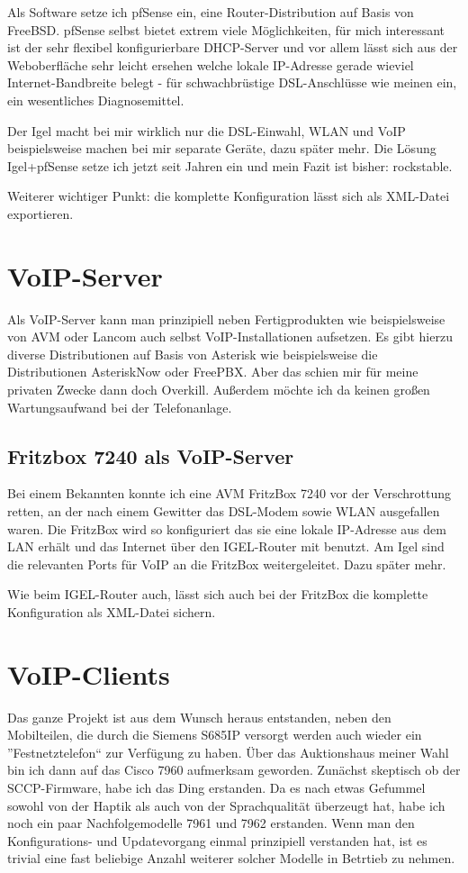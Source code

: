 \documentclass[a4paper,12pt]{scrbook}
\begin{document}
Als Software setze ich pfSense ein, eine Router-Distribution auf Basis von FreeBSD. pfSense selbst bietet extrem viele Möglichkeiten,
für mich interessant ist der sehr flexibel konfigurierbare DHCP-Server und vor allem lässt sich aus der Weboberfläche sehr leicht
ersehen welche lokale IP-Adresse gerade wieviel Internet-Bandbreite belegt - für schwachbrüstige DSL-Anschlüsse wie meinen ein, ein 
wesentliches Diagnosemittel. 

Der Igel macht bei mir wirklich nur die DSL-Einwahl, WLAN und VoIP beispielsweise machen bei mir separate Geräte, dazu später mehr.
Die Lösung Igel+pfSense setze ich jetzt seit Jahren ein und mein Fazit ist bisher: rockstable.

Weiterer wichtiger Punkt: die komplette Konfiguration lässt sich als XML-Datei exportieren.

\section{VoIP-Server}
Als VoIP-Server kann man prinzipiell neben Fertigprodukten wie beispielsweise von AVM oder Lancom auch selbst VoIP-Installationen aufsetzen.
Es gibt hierzu diverse Distributionen auf Basis von Asterisk wie beispielsweise die Distributionen AsteriskNow oder FreePBX. Aber das schien mir
für meine privaten Zwecke dann doch Overkill. Außerdem möchte ich da keinen großen Wartungsaufwand bei der Telefonanlage.

\subsection{Fritzbox 7240 als VoIP-Server}
Bei einem Bekannten konnte ich eine AVM FritzBox 7240 vor der Verschrottung retten, an der nach einem Gewitter das DSL-Modem sowie 
WLAN ausgefallen waren. Die FritzBox wird so konfiguriert das sie eine lokale IP-Adresse aus dem LAN erhält und das Internet über den
IGEL-Router mit benutzt. Am Igel sind die relevanten Ports für VoIP an die FritzBox weitergeleitet. Dazu später mehr.

Wie beim IGEL-Router auch, lässt sich auch bei der FritzBox die komplette Konfiguration als XML-Datei sichern.


\section{VoIP-Clients}
Das ganze Projekt ist aus dem Wunsch heraus entstanden, neben den Mobilteilen, die durch die Siemens S685IP versorgt werden auch wieder ein
''Festnetztelefon`` zur Verfügung zu haben. Über das Auktionshaus meiner Wahl bin ich dann auf das Cisco 7960 aufmerksam geworden. Zunächst
skeptisch ob der SCCP-Firmware, habe ich das Ding erstanden. Da es nach etwas Gefummel sowohl von der Haptik als auch von der Sprachqualität 
überzeugt hat, habe ich noch ein paar Nachfolgemodelle 7961 und 7962 erstanden. Wenn man den Konfigurations- und Updatevorgang einmal prinzipiell
verstanden hat, ist es trivial eine fast beliebige Anzahl weiterer solcher Modelle in Betrtieb zu nehmen. 
\end{document}
